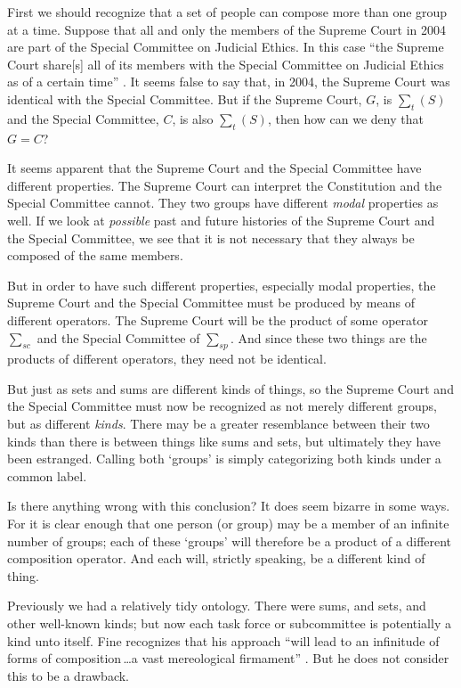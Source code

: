 \documentclass[11pt]{article}
\begin{document}
\begin{spacing}{1.5}
First we should recognize that a set of people can compose more than
one group at a time.  Suppose that all and only the members of the
Supreme Court in 2004 are part of the Special Committee on Judicial
Ethics.  In this case ``the Supreme Court share[s] all of its members
with the Special Committee on Judicial Ethics as of a certain time''
\citep[151]{uzquiano2004a}.  It seems false to say that, in 2004, the
Supreme Court was identical with the Special Committee.  But if the
Supreme Court, $G$, is $\sum _{t} ( S )$ and the Special Committee,
$C$, is also $\sum _{t} ( S )$, then how can we deny that $G = C$?

It seems apparent that the Supreme Court and the Special Committee
have different properties.  The Supreme Court can interpret the
Constitution and the Special Committee cannot.  They two groups have
different {\em modal} properties as well.  If we look at {\em
  possible} past and future histories of the Supreme Court and the
Special Committee, we see that it is not necessary that they always be
composed of the same members.

But in order to have such different properties, especially modal
properties, the Supreme Court and the Special Committee must be
produced by means of different operators.  The Supreme Court will be
the product of some operator $\sum _{sc}$ and the Special Committee of
$\sum _{sp}$.  And since these two things are the products of
different operators, they need not be identical.

But just as sets and sums are different kinds of things, so the
Supreme Court and the Special Committee must now be recognized as not
merely different groups, but as different {\em kinds}.  There may be a
greater resemblance between their two kinds than there is between
things like sums and sets, but ultimately they have been estranged.
Calling both `groups' is simply categorizing both kinds under a common
label.

Is there anything wrong with this conclusion?  It does seem bizarre in
some ways.  For it is clear enough that one person (or group) may be a
member of an infinite number of groups; each of these `groups' will
therefore be a product of a different composition operator.  And each
will, strictly speaking, be a different kind of thing.

Previously we had a relatively tidy ontology.  There were sums, and
sets, and other well-known kinds; but now each task force or
subcommittee is potentially a kind unto itself.  Fine recognizes that
his approach ``will lead to an infinitude of forms of
composition\,\ldots a vast mereological firmament''
\citeyearpar[576]{fine2010}.  But he does not consider this to be a
drawback.


\end{spacing}
\end{document}
